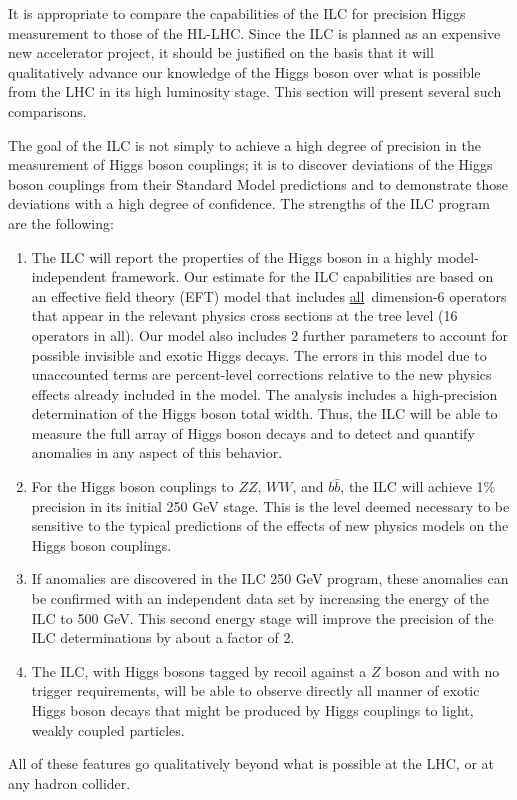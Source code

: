 It is appropriate to compare the capabilities of the ILC for precision
Higgs measurement to those of the HL-LHC.  Since the ILC is planned as
an expensive new accelerator project, it should be justified on the
basis that it will qualitatively advance our knowledge of the Higgs
boson over what is possible from the LHC in its high luminosity stage.  
This section will present several such comparisons.

The goal of the ILC is not simply to achieve a high degree of
precision in the measurement of Higgs boson couplings; it is to
discover deviations of the Higgs boson couplings from their Standard
Model predictions and to demonstrate those deviations with a high
degree of confidence.  The strengths of the ILC program are the
 following:
\begin{enumerate}
\item The ILC will report the properties of the Higgs boson in a
  highly model-independent framework.   Our estimate for the ILC capabilities
  are based on an effective field theory (EFT) model that includes
 {\underline{all}}\ dimension-6 operators that appear in the relevant physics
  cross sections at the tree level  (16 operators in all).   Our model
  also includes 2 further parameters to account for possible invisible
  and exotic Higgs decays.  The errors in this model due to
  unaccounted terms are percent-level corrections relative to the new
  physics effects already included in the model.   The analysis includes a
  high-precision determination of the Higgs boson total width. 
 Thus, the ILC will be able to measure  the full array of Higgs 
boson decays and to detect and quantify anomalies in any aspect of this behavior.
\item  For the Higgs boson couplings to $ZZ$, $WW$, and $b\bar b$, 
the ILC will achieve 1\% precision in its initial 250 GeV
  stage.   This is the
 level deemed necessary to be sensitive to the typical predictions 
of the effects of new physics models on the Higgs boson couplings.
\item  If  anomalies are  discovered in the ILC 
250 GeV program, these
  anomalies can be confirmed with an independent data set by
  increasing the energy of the ILC to 500 GeV.   This second energy
  stage will improve the precision of the ILC 
determinations by about a factor of 2.  
\item The ILC, with Higgs bosons tagged by recoil against a $Z$ boson
  and with no trigger requirements, will be able to observe directly
  all manner of exotic Higgs boson decays that might be produced by
Higgs couplings  to  light, weakly coupled  particles.
\end{enumerate}
All of these features go qualitatively beyond what is possible at the 
LHC, or at any hadron collider.

